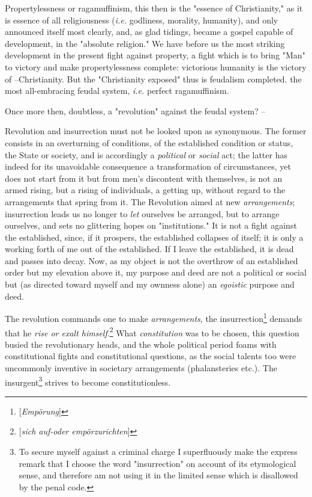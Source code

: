 Propertylessness or ragamuffinism, this then is the "{}essence of 
Christianity,"{} as it is essence of all religiousness (\textit{i.e.} 
godliness, morality, humanity), and only announced itself most clearly, and, 
as glad tidings, became a gospel capable of development, in the "{}absolute 
religion."{} We have before us the most striking development in the present 
fight against property, a fight which is to bring "{}Man"{} to victory and 
make propertylessness complete: victorious humanity is the victory of 
--Christianity. But the "{}Christianity exposed"{} thus is feudalism 
completed. the most all-embracing feudal system, \textit{i.e.} perfect 
ragamuffinism.

Once more then, doubtless, a "{}revolution"{} against the feudal system? --

Revolution and insurrection must not be looked upon as synonymous. The former 
consists in an overturning of conditions, of the established condition or 
status, the State or society, and is accordingly a \textit{political} or 
\textit{social} act; the latter has indeed for its unavoidable consequence a 
transformation of circumstances, yet does not start from it but from men's 
discontent with themselves, is not an armed rising, but a rising of 
individuals, a getting up, without regard to the arrangements that spring from 
it. The Revolution aimed at new \textit{arrangements}; insurrection leads us 
no longer to \textit{let} ourselves be arranged, but to arrange ourselves, and 
sets no glittering hopes on "{}institutions."{} It is not a fight against the 
established, since, if it prospers, the established collapses of itself; it is 
only a working forth of me out of the established. If I leave the established, 
it is dead and passes into decay. Now, as my object is not the overthrow of an 
established order but my elevation above it, my purpose and deed are not a 
political or social but (as directed toward myself and my ownness alone) an 
\textit{egoistic} purpose and deed.

The revolution commands one to make \textit{arrangements}, the 
insurrection\footnote{[\textit{Emp\"orung}]} demands that he \textit{rise or 
exalt himself}.\footnote{[\textit{sich auf-oder emp\"orzurichten}]} What 
\textit{constitution} was to be chosen, this question busied the revolutionary 
heads, and the whole political period foams with constitutional fights and 
constitutional questions, as the social talents too were uncommonly inventive 
in societary arrangements (phalansteries etc.). The insurgent\footnote{To 
secure myself against a criminal charge I superfluously make the express 
remark that I choose the word "{}insurrection"{} on account of its 
etymological sense, and therefore am not using it in the limited sense which 
is disallowed by the penal code.} strives to become constitutionless.

